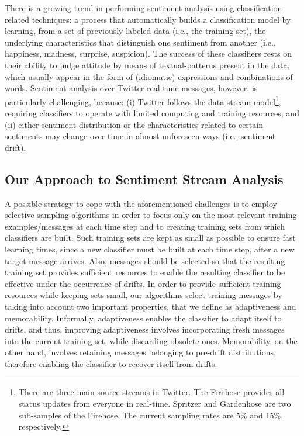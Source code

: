 There is a growing trend in performing sentiment analysis using classification-related techniques: a process that automatically
builds a classification model by learning, from a set of previously
labeled data (i.e., the training-set), the underlying characteristics that distinguish one sentiment from another (i.e., happiness, madness, surprise, suspicion). The success of these classifiers
rests on their ability to judge attitude by means of textual-patterns present in the data, which usually appear in the form
of (idiomatic) expressions and combinations of words.
Sentiment analysis over Twitter real-time messages, however, is particularly challenging, because: (i) Twitter follows the data stream model\footnote{
There are three main source streams in Twitter. The Firehose provides all status updates from everyone in real-time.
Spritzer and Gardenhose are two sub-samples of the Firehose. The current sampling rates are 5\% and 15\%, respectively.},
requiring classifiers to operate with limited computing and training resources, 
and (ii)
either sentiment distribution or the characteristics related to certain sentiments may change over time in almost unforeseen ways (i.e., sentiment drift).

\subsection*{Our Approach to Sentiment Stream Analysis}
A possible strategy to cope with the aforementioned challenges is to employ selective sampling algorithms in order to
focus only on the most relevant training examples/messages at
each time step and to creating training sets from which classifiers are built. Such
training sets are kept as small as possible to ensure fast learning times, since a new classifier must be built at each time step, after a new target message arrives.
Also, messages should be
selected so that the resulting training set
provides sufficient resources to enable the resulting classifier to be effective under the occurrence of drifts.
In order to provide sufficient training resources while keeping sets small, our algorithms select training messages by taking into account two
important properties, that we define as adaptiveness and memorability.
Informally, adaptiveness enables the classifier to adapt
itself to drifts, and thus, improving adaptiveness involves incorporating fresh messages into
the current training set, while discarding obsolete ones. Memorability, on the other hand, involves retaining messages belonging to pre-drift distributions,
therefore enabling the classifier to recover itself from drifts.

